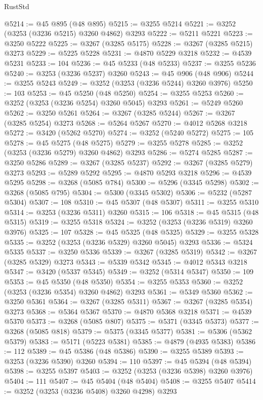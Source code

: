 \begin{lexlean}{RustStd}
\begin{coremodule}
{\begin{coremodule}
{{{{{{{{{{{{{{{{{{{{{{{{{{{{{{{{{{{{{{{@5214 := @45 @895 (@48 @895)
@5215 := @3255 @5214
@5221 := @3252 (@3253 (@3236 @5215) @3260 @4862) @3293
@5222 := @5211 @5221
@5223 := @3250 @5222
@5225 := @3267 (@3285 @5175)
@5228 := @3267 (@3285 @5215) @3273
@5229 := @5225 @5228
@5231 := @4870 @5229 @3218
@5232 := @4539 @5231
@5233 := 104
@5236 := @45 @5233 (@48 @5233)
@5237 := @3255 @5236
@5240 := @3253 (@3236 @5237) @3260
@5243 := @45 @906 (@48 @906)
@5244 := @3255 @5243
@5249 := @3252 (@3253 (@3236 @5244) @3260 @3976)
@5250 := 103
@5253 := @45 @5250 (@48 @5250)
@5254 := @3255 @5253
@5260 := @3252 (@3253 (@3236 @5254) @3260 @5045) @3293
@5261 := @5249 @5260
@5262 := @3250 @5261
@5264 := @3267 (@3285 @5244)
@5267 := @3267 (@3285 @5254) @3273
@5268 := @5264 @5267
@5270 := @4012 @5268 @3218
@5272 := @3420 (@5262 @5270)
@5274 := @3252 (@5240 @5272)
@5275 := 105
@5278 := @45 @5275 (@48 @5275)
@5279 := @3255 @5278
@5285 := @3252 (@3253 (@3236 @5279) @3260 @4862) @3293
@5286 := @5274 @5285
@5287 := @3250 @5286
@5289 := @3267 (@3285 @5237)
@5292 := @3267 (@3285 @5279) @3273
@5293 := @5289 @5292
@5295 := @4870 @5293 @3218
@5296 := @4539 @5295
@5298 := @3268 (@5085 @784)
@5300 := @5296 (@3345 @5298)
@5302 := @3268 (@5085 @795)
@5304 := @5300 (@3345 @5302)
@5306 := @5232 (@5287 @5304)
@5307 := 108
@5310 := @45 @5307 (@48 @5307)
@5311 := @3255 @5310
@5314 := @3253 (@3236 @5311) @3260
@5315 := 106
@5318 := @45 @5315 (@48 @5315)
@5319 := @3255 @5318
@5324 := @3252 (@3253 (@3236 @5319) @3260 @3976)
@5325 := 107
@5328 := @45 @5325 (@48 @5325)
@5329 := @3255 @5328
@5335 := @3252 (@3253 (@3236 @5329) @3260 @5045) @3293
@5336 := @5324 @5335
@5337 := @3250 @5336
@5339 := @3267 (@3285 @5319)
@5342 := @3267 (@3285 @5329) @3273
@5343 := @5339 @5342
@5345 := @4012 @5343 @3218
@5347 := @3420 (@5337 @5345)
@5349 := @3252 (@5314 @5347)
@5350 := 109
@5353 := @45 @5350 (@48 @5350)
@5354 := @3255 @5353
@5360 := @3252 (@3253 (@3236 @5354) @3260 @4862) @3293
@5361 := @5349 @5360
@5362 := @3250 @5361
@5364 := @3267 (@3285 @5311)
@5367 := @3267 (@3285 @5354) @3273
@5368 := @5364 @5367
@5370 := @4870 @5368 @3218
@5371 := @4539 @5370
@5373 := @3268 (@5085 @807)
@5375 := @5371 (@3345 @5373)
@5377 := @3268 (@5085 @818)
@5379 := @5375 (@3345 @5377)
@5381 := @5306 (@5362 @5379)
@5383 := @5171 (@5223 @5381)
@5385 := @4879 (@4935 @5383)
@5386 := 112
@5389 := @45 @5386 (@48 @5386)
@5390 := @3255 @5389
@5393 := @3253 (@3236 @5390) @3260
@5394 := 110
@5397 := @45 @5394 (@48 @5394)
@5398 := @3255 @5397
@5403 := @3252 (@3253 (@3236 @5398) @3260 @3976)
@5404 := 111
@5407 := @45 @5404 (@48 @5404)
@5408 := @3255 @5407
@5414 := @3252 (@3253 (@3236 @5408) @3260 @4298) @3293
}}}}}}}}}}}}}}}}}}}}}}}}}}}}}}}}}}}}}}}
\end{coremodule}}
\end{coremodule}
\end{lexlean}
